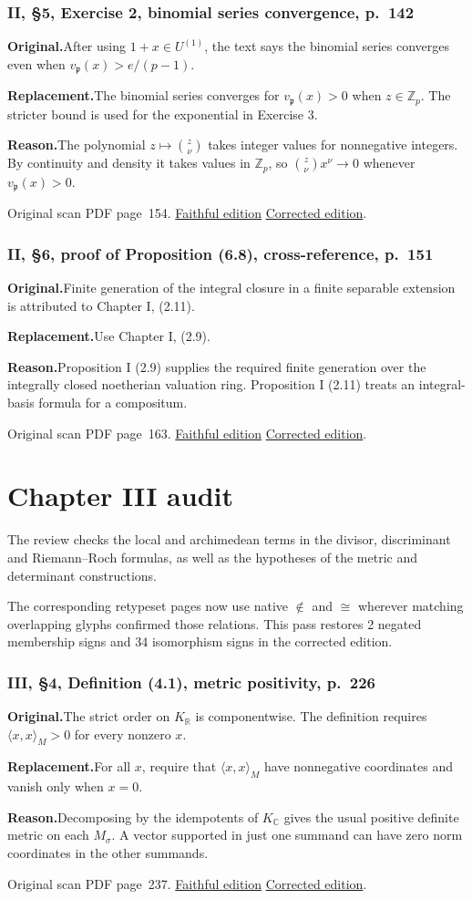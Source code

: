 \documentclass[11pt,a4paper]{article}
\newcommand{\original}{\par\smallskip\noindent\textbf{Original.}\enspace}
\newcommand{\replacement}{\par\smallskip\noindent\textbf{Replacement.}\enspace}
\newcommand{\reason}{\par\smallskip\noindent\textbf{Reason.}\enspace}
\newcommand{\editionlink}[3]{\href{#1\#errata.#2}{#3}}
\newcommand{\location}[2]{%
  \par\smallskip\noindent Original scan PDF page~#2.\enspace
  \editionlink{Neukirch_Faithful.pdf}{#1}{Faithful edition}
  \quad\editionlink{Neukirch_Corrected.pdf}{#1}{Corrected edition}.}
\begin{document}
\setcounter{section}{82}
\section{II, \S5, Exercise 2, binomial series convergence, p.~142}\label{errata:item:83}

\original After using $1+x\in U^{(1)}$, the text says the binomial series converges even when $v_{\mathfrak p}(x)>e/(p-1)$.
\replacement The binomial series converges for $v_{\mathfrak p}(x)>0$ when $z\in\mathbb Z_p$. The stricter bound is used for the exponential in Exercise 3.
\reason The polynomial $z\mapsto\binom z\nu$ takes integer values for nonnegative integers. By continuity and density it takes values in $\mathbb Z_p$, so $\binom z\nu x^\nu\to0$ whenever $v_{\mathfrak p}(x)>0$.
\location{83}{154}

\setcounter{section}{83}
\section{II, \S6, proof of Proposition (6.8), cross-reference, p.~151}\label{errata:item:84}

\original Finite generation of the integral closure in a finite separable extension is attributed to Chapter I, (2.11).
\replacement Use Chapter I, (2.9).
\reason Proposition I (2.9) supplies the required finite generation over the integrally closed noetherian valuation ring. Proposition I (2.11) treats an integral-basis formula for a compositum.
\location{84}{163}

\clearpage
\part{Chapter III audit}
The review checks the local and archimedean terms in the divisor, discriminant and Riemann--Roch formulas, as well as the hypotheses of the metric and determinant constructions.\par The corresponding retypeset pages now use native \(\notin\) and \(\cong\) wherever matching overlapping glyphs confirmed those relations. This pass restores 2 negated membership signs and 34 isomorphism signs in the corrected edition.
\setcounter{section}{84}
\section{III, \S4, Definition (4.1), metric positivity, p.~226}\label{errata:item:85}

\original The strict order on $K_{\mathbb R}$ is componentwise. The definition requires $\langle x,x\rangle_M>0$ for every nonzero $x$.
\replacement For all $x$, require that $\langle x,x\rangle_M$ have nonnegative coordinates and vanish only when $x=0$.
\reason Decomposing by the idempotents of $K_{\mathbb C}$ gives the usual positive definite metric on each $M_\sigma$. A vector supported in just one summand can have zero norm coordinates in the other summands.
\location{85}{237}
\end{document}
